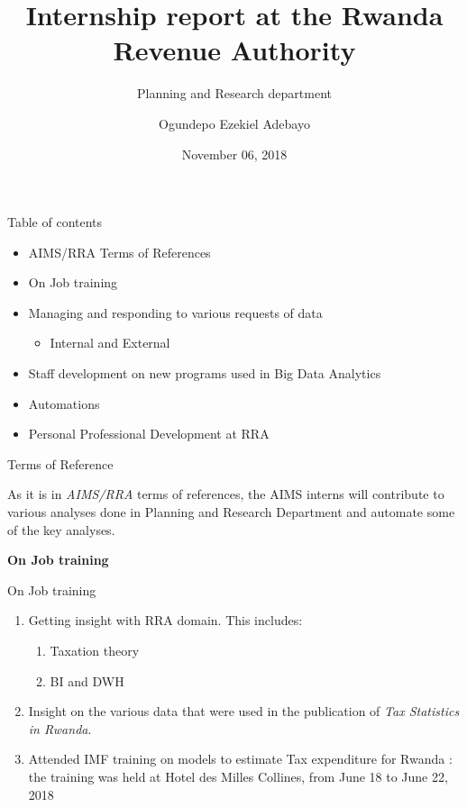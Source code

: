 \documentclass[ignorenonframetext,]{beamer}
\title{Internship report at the Rwanda Revenue Authority}
\subtitle{Planning and Research department}
\author{Ogundepo Ezekiel Adebayo}
\date{November 06, 2018}
\providecommand{\tightlist}{%
  \setlength{\itemsep}{0pt}\setlength{\parskip}{0pt}}
\begin{document}
\frame{\titlepage}

\begin{frame}{Table of contents}

\begin{itemize}
\tightlist
\item
  AIMS/RRA Terms of References
\item
  On Job training
\item
  Managing and responding to various requests of data

  \begin{itemize}
  \tightlist
  \item
    Internal and External
  \end{itemize}
\item
  Staff development on new programs used in Big Data Analytics
\item
  Automations
\item
  Personal Professional Development at RRA
\end{itemize}

\end{frame}

\begin{frame}{Terms of Reference}

As it is in \textit{AIMS/RRA} terms of references, the AIMS interns will
contribute to various analyses done in Planning and Research Department
and automate some of the key analyses.

\end{frame}

\begin{frame}{}

\begin{center}
\textbf{On Job training}
\end{center}

\end{frame}

\begin{frame}{On Job training}

\begin{enumerate}
\def\labelenumi{\arabic{enumi}.}
\tightlist
\item
  Getting insight with RRA domain. This includes:

  \begin{enumerate}
  \def\labelenumii{\arabic{enumii}.}
  \tightlist
  \item
    Taxation theory
  \item
    BI and DWH
  \end{enumerate}
\item
  Insight on the various data that were used in the publication of
  \textit{Tax Statistics in Rwanda}.
\item
  Attended IMF training on models to estimate Tax expenditure for Rwanda
  : the training was held at Hotel des Milles Collines, from June 18 to
  June 22, 2018
\end{enumerate}

\end{frame}
\end{document}
